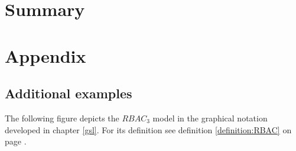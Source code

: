\documentclass[twoside, openright, 12pt]{book}
\begin{document}

\cleardoublepage
\chapter{Summary}
\label{summary}
\blindtext



\cleardoublepage
{}
\renewcommand{\thesection}{\Alph{section}}
\chapter*{Appendix}
\label{appendix}
\section{Additional examples}
The following figure depicts the $RBAC_3$ model in the graphical notation developed in chapter \ref{gsl}.
For its definition see definition \ref{definition:RBAC} on page \pageref{definition:RBAC}.




\cleardoublepage
\DeclareRobustCommand{\citeext}[1]{\citeauthor{#1}~\cite{#1}}




\end{document}
